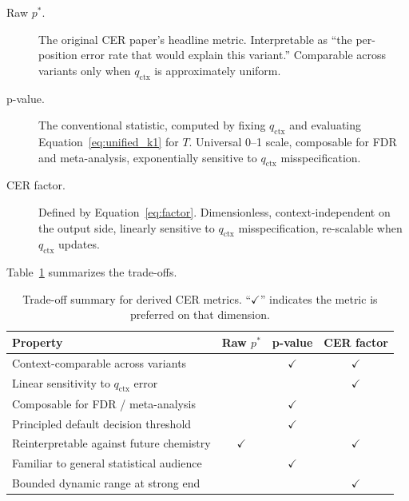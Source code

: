\documentclass[11pt]{article}
\begin{document}
\begin{description}
\item[Raw $p^*$.] The original CER paper's headline metric. Interpretable as
``the per-position error rate that would explain this variant.'' Comparable
across variants only when $q_\text{ctx}$ is approximately uniform.

\item[p-value.] The conventional statistic, computed by fixing $q_\text{ctx}$
and evaluating Equation~\ref{eq:unified_k1} for $T$. Universal 0--1 scale,
composable for FDR and meta-analysis, exponentially sensitive to
$q_\text{ctx}$ misspecification.

\item[CER factor.] Defined by Equation~\ref{eq:factor}. Dimensionless,
context-independent on the output side, linearly sensitive to $q_\text{ctx}$
misspecification, re-scalable when $q_\text{ctx}$ updates.
\end{description}

Table~\ref{tab:metric_comparison} summarizes the trade-offs.

\begin{table}[htbp]
\centering
\caption{Trade-off summary for derived CER metrics. ``$\checkmark$'' indicates
the metric is preferred on that dimension.}
\label{tab:metric_comparison}
\small
\begin{tabular}{lccc}
\toprule
Property & Raw $p^*$ & p-value & CER factor \\
\midrule
Context-comparable across variants                  &              &  $\checkmark$ & $\checkmark$ \\
Linear sensitivity to $q_\text{ctx}$ error          &              &              & $\checkmark$ \\
Composable for FDR / meta-analysis                  &              & $\checkmark$ &              \\
Principled default decision threshold               &              & $\checkmark$ &              \\
Reinterpretable against future chemistry            & $\checkmark$ &              & $\checkmark$ \\
Familiar to general statistical audience            &              & $\checkmark$ &              \\
Bounded dynamic range at strong end                 &              &              & $\checkmark$ \\
\bottomrule
\end{tabular}
\end{table}
\end{document}
